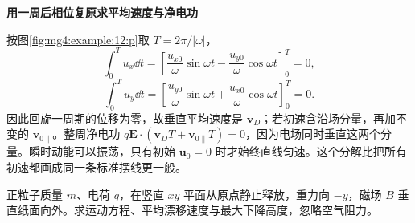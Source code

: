 \begin{solution}
{\begin{tikzpicture}
\end{tikzpicture}}



\par\medskip{}\noindent\textbf{用一周后相位复原求平均速度与净电功}\par\nobreak
按图\ref{fig:mg4:example:12:p}取 $T=2\pi/|\omega|$，
\[
 \int_0^T u_x\dd t=
 \left[\frac{u_{x0}}{\omega}\sin\omega t
       -\frac{u_{y0}}{\omega}\cos\omega t\right]_0^T=0,
\]
\[
 \int_0^T u_y\dd t=
 \left[\frac{u_{y0}}{\omega}\sin\omega t
       +\frac{u_{x0}}{\omega}\cos\omega t\right]_0^T=0.
\]
因此回旋一周期的位移为零，故垂直平均速度是 $\bm v_D$；若初速含沿场分量，再加不变的 $\bm v_{0\parallel}$。整周净电功 $q\bm E\cdot(\bm v_DT+\bm v_{0\parallel}T)=0$，因为电场同时垂直这两个分量。瞬时动能可以振荡，只有初始 $\bm u_0=0$ 时才始终直线匀速。这个分解比把所有初速都画成同一条标准摆线更一般。\end{solution}
\begin{question}\begin{example}[重力与磁场共同作用下的水平漂移]\label{mg4:example:13}
正粒子质量 $m$、电荷 $q$，在竖直 $xy$ 平面从原点静止释放，重力向 $-y$，磁场 $B$ 垂直纸面向外。求运动方程、平均漂移速度与最大下降高度，忽略空气阻力。
\end{example}
\end{question}
